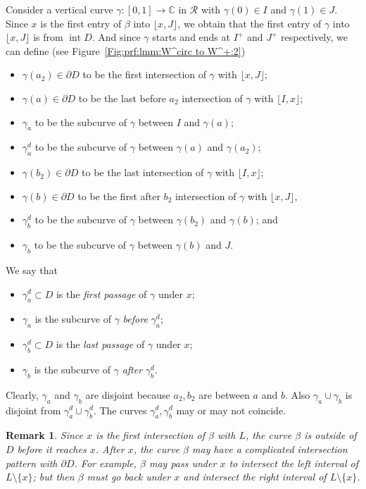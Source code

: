 \documentclass{amsart}
\newcommand{\1}{{\mathbb 1 }}
\newcommand\RR{\mathcal{R}}
\newcommand\intr{\operatorname{int}}
\newcommand{\C}{\mathbb{C}}
\newtheorem{rem}[thm]{Remark}
\theoremstyle{remark}
\numberwithin{equation}{section}
\theoremstyle{definition}
\begin{document}
Consider a vertical curve $\gamma\colon [0,1]\to \C$ in $\RR$ with $\gamma(0)\in I$ and $\gamma(1)\in  J$. Since $x$ is the first entry of $\beta$ into $\lfloor x, J \rfloor$, we obtain that the first entry of $\gamma$ into $\lfloor x, J \rfloor$ is from $\intr D$. And since $\gamma$ starts and ends at $I^+$ and $J^+$ respectively, we can define (see Figure~\ref{Fig:prf:lmm:W^circ to W^+:2})
\begin{itemize} 
\item $\gamma(a_2)\in \partial D$ to be the first intersection of $\gamma$ with $\lfloor x, J\rfloor $;
\item $\gamma(a)\in  \partial D$ to be the last before $a_2$ intersection of $\gamma$ with $\lfloor I, x\rfloor$;
\item $\gamma_a$ to be the subcurve of $\gamma$ between $I$ and $\gamma(a)$;
\item $\gamma_{a}^d$ to be the subcurve of $\gamma$ between $\gamma(a)$ and $\gamma(a_2)$;
\item $\gamma(b_2)\in  \partial D$ to be the last intersection of $\gamma$ with $\lfloor I, x\rfloor$; 
\item $\gamma(b)\in  \partial D$ to be the first after $b_2$ intersection of $\gamma$ with  $\lfloor x, J\rfloor $,
\item $\gamma_{b}^{d}$ to be the subcurve of $\gamma$ between $\gamma(b_2)$ and $\gamma(b)$; and
\item $\gamma_b$ to be the subcurve of $\gamma$ between $\gamma(b)$ and $J$.
\end{itemize}

We say that
\begin{itemize}
\item $\gamma_a^d\subset D$ is the \emph{first passage} of $\gamma$ under $x$;
\item  $\gamma_a$ is the subcurve of $\gamma$ \emph{before} $\gamma_a^d$;
\item $\gamma_b^d\subset D$ is the \emph{last passage} of $\gamma$ under $x$;
\item $\gamma_b$ is the subcurve of $\gamma$ \emph{after} $\gamma_b^d$.
\end{itemize}
 

Clearly, $\gamma_a$ and $\gamma_b$ are disjoint because $a_2,b_2 $ are between $a$ and $b$. Also $\gamma_a\cup \gamma_b$ is disjoint from $\gamma_a^d\cup \gamma_b^d$. The curves $\gamma_a^d, \gamma_b^d$ may or may not coincide.


\begin{rem} Since $x$ is the first intersection of $\beta$ with $L$, the curve $\beta$ is outside of $D$ before it reaches $x$. After $x$, the curve $\beta$ may have a complicated intersection pattern with $\partial D$. For example, $\beta$ may pass under $x$ to intersect the left interval of $L\setminus \{x\}$; but then $\beta$ must go back under $x$
and intersect the right interval of $L\setminus \{x\}$. 
\end{rem}
\end{document}
